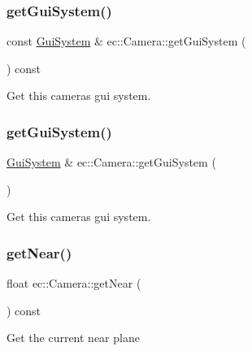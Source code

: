 \subsubsection{\texorpdfstring{get\+Gui\+System()}{getGuiSystem()}\hspace{0.1cm}{\footnotesize\ttfamily [1/2]}}
{\footnotesize\ttfamily const \mbox{\hyperlink{classec_1_1_gui_system}{Gui\+System}} \& ec\+::\+Camera\+::get\+Gui\+System (\begin{DoxyParamCaption}{ }\end{DoxyParamCaption}) const}

Get this camera\textquotesingle{}s gui system. \mbox{\label{classec_1_1_camera_a3af91683c492e0094127f169a4927945}} 
\subsubsection{\texorpdfstring{get\+Gui\+System()}{getGuiSystem()}\hspace{0.1cm}{\footnotesize\ttfamily [2/2]}}
{\footnotesize\ttfamily \mbox{\hyperlink{classec_1_1_gui_system}{Gui\+System}} \& ec\+::\+Camera\+::get\+Gui\+System (\begin{DoxyParamCaption}{ }\end{DoxyParamCaption})}

Get this camera\textquotesingle{}s gui system. \mbox{\label{classec_1_1_camera_a02786d8adecb275e6182cf166b65edb4}} 
\subsubsection{\texorpdfstring{get\+Near()}{getNear()}}
{\footnotesize\ttfamily float ec\+::\+Camera\+::get\+Near (\begin{DoxyParamCaption}{ }\end{DoxyParamCaption}) const}

Get the current near plane \mbox{\label{classec_1_1_camera_a5c245ceac5e710447b88a26a66dcc348}} 
